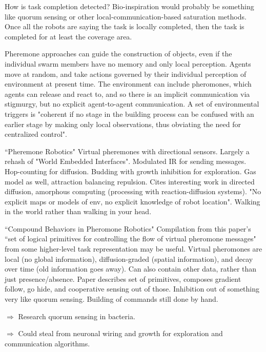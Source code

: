 \documentclass[]{article}
\begin{document}
How is task completion detected? Bio-inspiration would probably be something like quorum sensing or other local-communication-based saturation methods. Once all the robots are saying the task is locally completed, then the task is completed for at least the coverage area. 

Pheremone approaches can guide the construction of objects, even if the individual swarm members have no memory and only local perception\cite{mason2003programming}. 
Agents move at random, and take actions governed by their individual perception of environment at present time. 
The environment can include pheromones, which agents can release and react to, and so there is an implicit communication via stigmurgy, but no explicit agent-to-agent communication. 
A set of environmental triggers is "coherent if no stage in the building process can be confused with an earlier stage by making only local observations, thus obviating the need for centralized control".   

``Pheremone Robotics" \cite{payton2001pheromone} Virtual pheremones with directional sensors. Largely a rehash of "World Embedded Interfaces". Modulated IR for sending messages. Hop-counting for diffusion. Budding with growth inhibition for exploration. Gas model as well, attraction balancing repulsion. Cites interesting work in directed diffusion, amorphous computing (processing with reaction-diffusion systems). "No explicit maps or models of env, no explicit knowledge of robot location". Walking in the world rather than walking in your head. 

``Compound Behaviors in Pheromone Robotics" \cite{payton2003compound} Compilation from this paper's ``set of logical primitives for controlling the flow of virtual pheromone messages" from some higher-level task representation may be useful. Virtual pheromones are local (no global information), diffusion-graded (spatial information), and decay over time (old information goes away). Can also contain other data, rather than just presence/absence. Paper describes set of primitives, composes gradient follow, go hide, and cooperative sensing out of those. Inhibition out of something very like quorum sensing. Building of commands still done by hand. 

$\Rightarrow$ Research quorum sensing in bacteria.

$\Rightarrow$ Could steal from neuronal wiring and growth for exploration and communication algorithms. 
\end{document}
